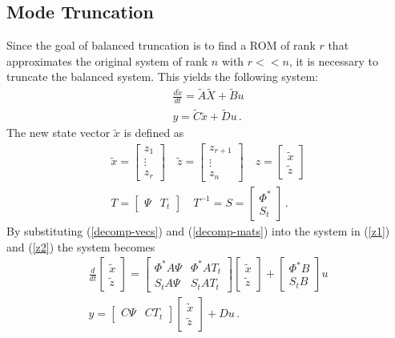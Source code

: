 \subsection{Mode Truncation}
Since the goal of balanced truncation is to find a ROM of rank \(r\) that approximates the original system of rank \(n\) with \(r << n\), it is necessary to truncate the balanced system.
This yields the following system:
\begin{gather}
\frac{d\tilde{x}}{dt} = \tilde{A}\tilde{X} + \tilde{B}u \\
y = \tilde{C}\tilde{x} + \tilde{D}u  \,.
\end{gather}
The new state vector \(\tilde{x}\) is defined as
\begin{gather}
\tilde{x} = \begin{bmatrix}
z_1 \\
\vdots \\
z_r
\end{bmatrix} \quad 
\tilde{z} = \begin{bmatrix}
z_{r+1} \\
\vdots \\
z_n
\end{bmatrix} \quad
z = \begin{bmatrix}
\tilde{x} \\
\tilde{z}
\end{bmatrix} \label{decomp-vecs}\\
T = \begin{bmatrix}
\Psi & T_t
\end{bmatrix} \quad
T^{-1} = S = \begin{bmatrix}
\Phi^{*} \\
S_t
\end{bmatrix}  \,. \label{decomp-mats}
\end{gather}
By substituting (\ref{decomp-vecs}) and (\ref{decomp-mats}) into the system in (\ref{z1}) and (\ref{z2}) the system becomes
\begin{gather}
\frac{d}{dt} \begin{bmatrix}
\tilde{x} \\
\tilde{z}
\end{bmatrix} = \begin{bmatrix}
\Phi^{*}A\Psi & \Phi^{*}AT_t \\
S_tA\Psi & S_tAT_t
\end{bmatrix} \begin{bmatrix}
\tilde{x} \\
\tilde{z}
\end{bmatrix}
+ \begin{bmatrix}
\Phi^{*}B \\
S_tB
\end{bmatrix} u \\
y = \begin{bmatrix}
C \Psi & CT_t
\end{bmatrix} \begin{bmatrix}
\tilde{x} \\
\tilde{z}
\end{bmatrix} + Du
 \,.
\end{gather}
